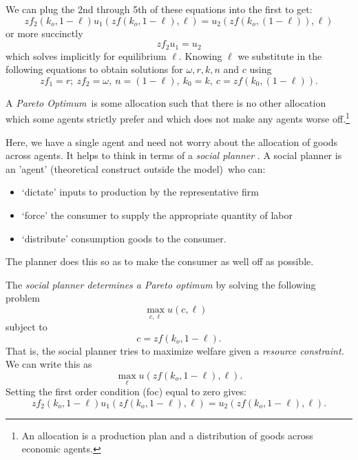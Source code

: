 \documentclass{sebase}
\begin{document}
We can plug the 2nd through 5th of these equations into the first to get: 
\begin{equation*}
zf_{2}\left( k_{o},1-\ell \right) u_{1}(zf\left( k_{o},1-\ell \right) ,\ell
)=u_{2}(zf\left( k_{o},\left( 1-\ell \right) \right) ,\ell )
\end{equation*}%
or more succinctly%
\begin{equation*}
zf_{2}u_{1}=u_{2}
\end{equation*}%
which solves implicitly for equilibrium $\ell $. Knowing $\ell $ we
substitute in the following equations to obtain solutions for $\omega ,r,k,n$
and $c$ using%
\begin{equation*}
zf_{1}=r;~zf_{2}=\omega ,~n=(1-\ell ),~k_{0}=k,~c=zf\left( k_{0},(1-\ell
)\right) .
\end{equation*}

\pagebreak

A \textit{Pareto Optimum}\ is some allocation such that there is no other
allocation which some agents strictly prefer and which does not make any
agents worse off.\footnote{%
An allocation is a production plan and a distribution of goods across
economic agents.}

Here, we have a single agent and need not worry about the allocation of
goods across agents. It helps to think in terms of a \textit{social planner}%
. A social planner is an 'agent' (theoretical construct outside the model)\
who can:

\begin{itemize}
\item `dictate' inputs to production by the representative firm

\item `force' the consumer to supply the appropriate quantity of labor

\item `distribute' consumption goods to the consumer.
\end{itemize}

The planner does this so as to make the consumer as well off as possible.
\pagebreak

The \textit{social planner determines a Pareto optimum }by solving the
following problem%
\begin{equation*}
\underset{c,\ell }{\max }u(c,\ell )\text{ }
\end{equation*}%
subject to%
\begin{equation*}
c=zf\left( k_{o},1-\ell \right) .
\end{equation*}%
That is, the social planner tries to maximize welfare given a \textit{%
resource constraint. }We can write this as 
\begin{equation*}
\underset{\ell }{\max }u(zf\left( k_{o},1-\ell \right) ,\ell )\text{.}
\end{equation*}%
Setting the first order condition (foc) equal to zero gives:%
\begin{equation*}
zf_{2}\left( k_{o},1-\ell \right) u_{1}(zf\left( k_{o},1-\ell \right) ,\ell
)=u_{2}(zf\left( k_{o},1-\ell \right) ,\ell ).
\end{equation*}%
\pagebreak
\end{document}
